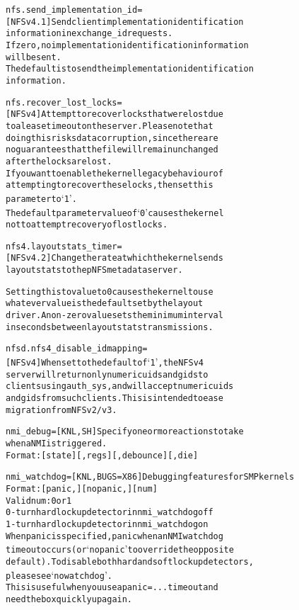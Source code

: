 \documentclass[a4paper,8pt,english]{sphinxmanual}
\begin{document}
\begin{alltt}
        nfs.send\_implementation\_id =
                        {[}NFSv4.1{]} Send client implementation identification
                        information in exchange\_id requests.
                        If zero, no implementation identification information
                        will be sent.
                        The default is to send the implementation identification
                        information.

        nfs.recover\_lost\_locks =
                        {[}NFSv4{]} Attempt to recover locks that were lost due
                        to a lease timeout on the server. Please note that
                        doing this risks data corruption, since there are
                        no guarantees that the file will remain unchanged
                        after the locks are lost.
                        If you want to enable the kernel legacy behaviour of
                        attempting to recover these locks, then set this
                        parameter to `1'.
                        The default parameter value of `0' causes the kernel
                        not to attempt recovery of lost locks.

        nfs4.layoutstats\_timer =
                        {[}NFSv4.2{]} Change the rate at which the kernel sends
                        layoutstats to the pNFS metadata server.

                        Setting this to value to 0 causes the kernel to use
                        whatever value is the default set by the layout
                        driver. A non-zero value sets the minimum interval
                        in seconds between layoutstats transmissions.

        nfsd.nfs4\_disable\_idmapping=
                        {[}NFSv4{]} When set to the default of `1', the NFSv4
                        server will return only numeric uids and gids to
                        clients using auth\_sys, and will accept numeric uids
                        and gids from such clients.  This is intended to ease
                        migration from NFSv2/v3.

        nmi\_debug=      {[}KNL,SH{]} Specify one or more actions to take
                        when a NMI is triggered.
                        Format: {[}state{]}{[},regs{]}{[},debounce{]}{[},die{]}

        nmi\_watchdog=   {[}KNL,BUGS=X86{]} Debugging features for SMP kernels
                        Format: {[}panic,{]}{[}nopanic,{]}{[}num{]}
                        Valid num: 0 or 1
                        0 - turn hardlockup detector in nmi\_watchdog off
                        1 - turn hardlockup detector in nmi\_watchdog on
                        When panic is specified, panic when an NMI watchdog
                        timeout occurs (or `nopanic' to override the opposite
                        default). To disable both hard and soft lockup detectors,
                        please see `nowatchdog'.
                        This is useful when you use a panic=... timeout and
                        need the box quickly up again.


\end{alltt}
\end{document}
